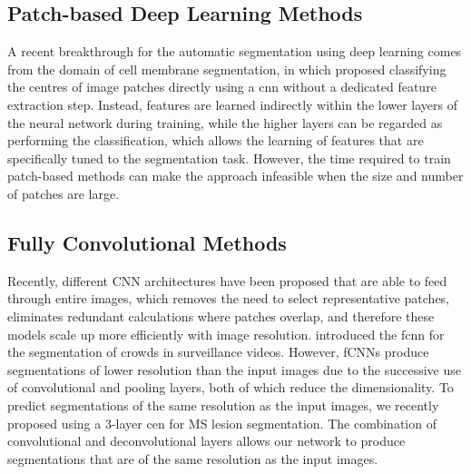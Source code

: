 \subsection[Patch-based deep learning methods]{Patch-based Deep Learning
Methods}

A recent breakthrough for the automatic segmentation using deep learning comes
from the domain of cell membrane segmentation, in which \citet{ciresan2012}
proposed classifying the centres of image patches directly using a \gls{cnn}
\citep{lecun1998} without a dedicated feature extraction step. Instead, features
are learned indirectly within the lower layers of the neural network during
training, while the higher layers can be regarded as performing the
classification, which allows the learning of features that are specifically
tuned to the segmentation task. However, the time required to train patch-based
methods can make the approach infeasible when the size and number of patches are
large.

\subsection[Fully convolutional methods]{Fully Convolutional Methods}

Recently, different CNN architectures
\citep{long2015,ronneberger2015,brosch2015,kang2014} have been proposed
that are able to feed through entire images, which removes the need to select
representative patches, eliminates redundant calculations where patches overlap,
and therefore these models scale up more efficiently with image resolution.
\citet{kang2014} introduced the \gls{fcnn} for the segmentation of crowds
in surveillance videos. However, fCNNs produce segmentations of lower resolution
than the input images due to the successive use of convolutional and pooling
layers, both of which reduce the dimensionality. To predict segmentations of the
same resolution as the input images, we recently proposed using a 3-layer
\gls{cen} \citep{brosch2015} for MS lesion segmentation. The combination of
convolutional \citep{lecun1998} and deconvolutional \citep{zeiler2011} layers
allows our network to produce segmentations that are of the same resolution as
the input images.

